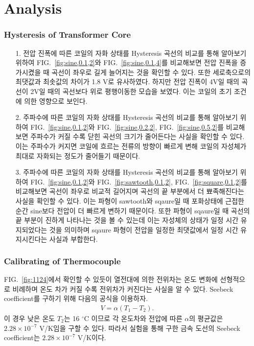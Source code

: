 \documentclass[aps,reprint,superscriptaddress,10pt]{revtex4-2}
\begin{document}
\section{Analysis}

\subsubsection{Hysteresis of Transformer Core}
\begin{itemize}
  \item[1. ] 전압 진폭에 따른 코일의 자화 상태를 Hysteresis 곡선의 비교를 통해 
  알아보기 위하여
  FIG.~\ref{fig:sine,0.1,2}와 
  FIG.~\ref{fig:sine,0.1,4}를
  비교해보면 전압 진폭을 증가시켰을 때 곡선이 좌우로 길게 늘어지는 것을 확인할 수 
  있다. 또한 세로축으로의 최댓값과 최솟값의 차이가 1.8 V로 유사하였다. 하지만
  전압 진폭이 4V일 때의 곡선이 2V일 때의 곡선보다 위로 평행이동한 모습을 보였다.
  이는 코일의 초기 조건에 의한 영향으로 보인다. 

  \item[2. ] 주파수에 따른 코일의 자화 상태를 Hysteresis 곡선의 비교를 통해 
  알아보기 위하여
  FIG.~\ref{fig:sine,0.1,2}와 
  FIG.~\ref{fig:sine,0.2,2}, FIG.~\ref{fig:sine,0.5,2}를
  비교해보면 주파수가 커질 수록 닫힌 곡선의 크기가 줄어든다는 사실을 확인할 수 있다.
  이는 주파수가 커지면 코일에 흐르는 전류의 방향이 빠르게 변해 코일의 자성체가
  최대로 자화되는 정도가 줄어들기 때문이다.
  

  \item[3. ] 주파수에 따른 코일의 자화 상태를 Hysteresis 곡선의 비교를 통해 
  알아보기 위하여
  FIG.~\ref{fig:sine,0.1,2}와 
  FIG.~\ref{fig:sawtooth,0.1,2}, FIG.~\ref{fig:square,0.1,2}를
  비교해보면 곡선이 좌우로 비교적 길어지며 곡선의 끝 부분에서 더 뾰족해진다는 사실을
  확인할 수 있다. 이는 파형이 sawtooth와 sqaure일 때 포화상태에 근접한 순간 sine보다 
  전압이 더 빠르게 변하기 때문이다. 또한 파형이 sqaure일 때 곡선의 끝 부분이 진하게
  나타나는 것을 볼 수 있는데 이는 자성체의 상태가 일정 시간 유지되었다는 것을 의미하며
  sqaure 파형이 전압을 일정한 최댓값에서 일정 시간 유지시킨다는 사실과 부합한다.
  
\end{itemize}



\subsubsection{Calibrating of Thermocouple}
FIG.~\ref{fig:1124}에서 확인할 수 있듯이 열전대에 의한 전위차는 온도 변화에 선형적으로
비례하며 온도 차가 커질 수록 전위차가 커진다는 사실을 알 수 있다. Seebeck coefficient를
구하기 위해 다음의 공식을 이용하자.
\begin{align}
  V = \alpha(T_1-T_2).
\end{align}
이 경우 낮은 온도 $T_2$는 16 $^\circ$C 이므로 각 온도차와 전압에 따른 $\alpha$의 평균값은
$2.28\times 10^{-7}$ V/K임을 구할 수 있다. 따라서 실험을 통해 구한
금속 도선의 Seebeck coefficient는 $2.28\times 10^{-7}$ V/K이다.
\end{document}
